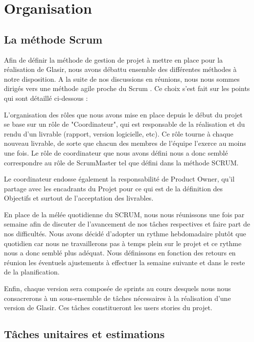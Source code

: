 \section{Organisation}
	\subsection{La méthode Scrum}
	\label{sec:gestion}

	Afin de définir la méthode de gestion de projet à mettre en place pour la réalisation de Glasir, nous avons débattu ensemble des différentes méthodes à notre disposition. A la suite de 	nos discussions en réunions, nous nous sommes dirigés vers une méthode agile proche du \og Scrum \fg. Ce choix s'est fait sur les points qui sont détaillé ci-dessous :

	L'organisation des rôles que nous avons mise en place depuis le début du projet se base sur un rôle de "Coordinateur", qui est responsable de la réalisation et du rendu d'un livrable (rapport, version logicielle, etc). Ce rôle tourne à chaque nouveau livrable, de sorte que chacun des membres de l'équipe l'exerce au moins une fois. Le rôle de coordinateur que nous avons défini nous a donc semblé correspondre au rôle de ScrumMaster tel que défini dans la méthode SCRUM.

	Le coordinateur endosse également la responsabilité de Product Owner, qu'il partage avec les encadrants du Projet pour ce qui est de la définition des Objectifs et surtout de l'acceptation des livrables.

	En place de la mélée quotidienne du SCRUM, nous nous réunissons une fois par semaine afin de discuter de l'avancement de nos tâches respectives et faire part de nos difficultés. Nous avons décidé d'adopter un rythme hebdomadaire plutôt que quotidien car nous ne travaillerons pas à temps plein sur le projet et ce rythme nous a donc semblé plus adéquat. Nous définissons en fonction des retours en réunion les éventuels ajustements à effectuer la semaine suivante et dans le reste de la planification.

	Enfin, chaque version sera composée de sprints au cours desquels nous nous consacrerons à un sous-ensemble de tâches nécessaires à la réalisation d'une version de Glasir. Ces tâches constitueront les users stories du projet. 
	
	\subsection{Tâches unitaires et estimations}
	\label{sec:taches_unitaires}


